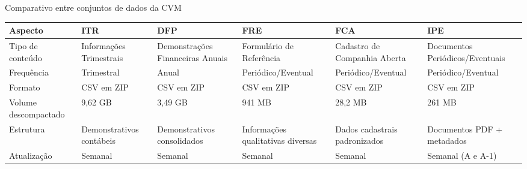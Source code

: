 \documentclass[recuosum=1.5cm]{iftex2024}
\begin{document}
\begin{board}[!htb]
	\centering
	\caption{Comparativo entre conjuntos de dados da CVM}
	\label{tab:comparativo_cvm}
	\begin{varwidth}{\linewidth}
		\scriptsize
		\begin{tabularx}{\textwidth}{|X|X|X|X|X|X|}
			\hline
			\textbf{Aspecto}     & \textbf{ITR}                      & \textbf{DFP}                       & \textbf{FRE}                                    & \textbf{FCA}                       & \textbf{IPE}                                         \\ \hline
			
			Tipo de conteúdo    & Informações Trimestrais         & Demonstrações Financeiras Anuais & Formulário de Referência                      & Cadastro de Companhia Aberta       & Documentos Periódicos/Eventuais                     \\ \hline
			
			Frequência          & Trimestral                        & Anual                              & Periódico/Eventual                             & Periódico/Eventual                & Periódico/Eventual                                  \\ \hline
			
			Formato              & CSV em ZIP                        & CSV em ZIP                         & CSV em ZIP                                      & CSV em ZIP                         & CSV em ZIP                                           \\ \hline
			
			Volume descompactado & 9,62 GB                           & 3,49 GB                            & 941 MB                                          & 28,2 MB                            & 261 MB                                               \\ \hline
			
			Estrutura            & Demonstrativos contábeis         & Demonstrativos consolidados        & Informações qualitativas diversas             & Dados cadastrais padronizados      & Documentos PDF + metadados                           \\ \hline
			
			Atualização        & Semanal                           & Semanal                            & Semanal                                         & Semanal                            & Semanal (A e A-1)                                    \\ \hline
			

\end{tabularx}
\end{varwidth}
\end{board}
\end{document}

